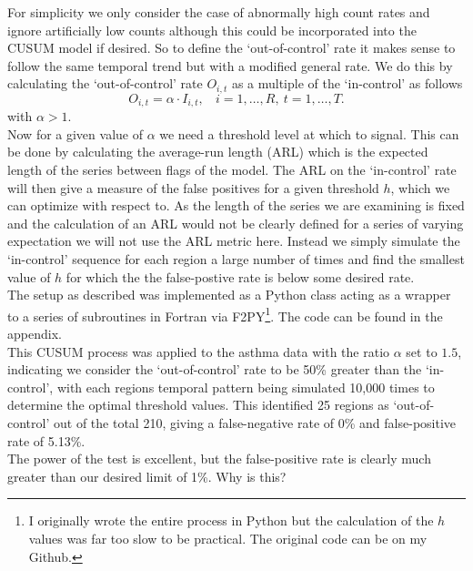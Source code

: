 \documentclass[11pt]{report}
\begin{document}
For simplicity we only consider the case of abnormally high count rates and ignore artificially low counts although this could be incorporated into the CUSUM model if desired. So to define the `out-of-control' rate it makes sense to follow the same temporal trend but with a modified general rate. We do this by calculating the `out-of-control' rate $O_{i,t}$ as a multiple of the `in-control' as follows
\begin{equation}
O_{i,t} = \alpha \cdot I_{i,t}, \ \ \ \  i = 1, \ldots, R, \ t = 1, \ldots, T.
\end{equation} 
with $\alpha > 1$. \\

Now for a given value of $\alpha$ we need a threshold level at which to signal. This can be done by calculating the average-run length (ARL) which is the expected length of the series between flags of the model. The ARL on the `in-control' rate will then give a measure of the false positives for a given threshold $h$, which we can optimize with respect to. As the length of the series we are examining is fixed and the calculation of an ARL would not be clearly defined for a series of varying expectation we will not use the ARL metric here. Instead we simply simulate the `in-control' sequence for each region a large number of times and find the smallest value of $h$ for which the the false-postive rate is below some desired rate. \\

The setup as described was implemented as a Python class acting as a wrapper to a series of subroutines in Fortran via F2PY\footnote{I originally wrote the entire process in Python but the calculation of the $h$ values was far too slow to be practical. The original code can be on my Github.}. The code can be found in the appendix. \\

This CUSUM process was applied to the asthma data with the ratio $\alpha$ set to $1.5$, indicating we consider the `out-of-control' rate to be 50\% greater than the `in-control', with each regions temporal pattern being simulated 10,000 times to determine the optimal threshold values. This identified 25 regions as `out-of-control' out of the total 210, giving a false-negative rate of 0\% and false-positive rate of 5.13\%. \\

The power of the test is excellent, but the false-positive rate is clearly much greater than our desired limit of 1\%. Why is this? \\  
\end{document}
